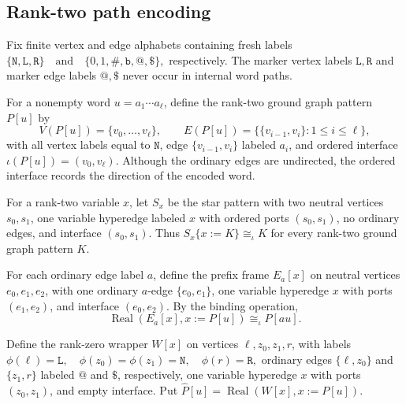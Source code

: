 \documentclass[11pt]{article}
\theoremstyle{definition}
\theoremstyle{remark}
\newcommand{\Real}{\operatorname{Real}}
\begin{document}
\subsection{Rank-two path encoding}

Fix finite vertex and edge alphabets containing fresh labels
\(\{\mathtt N,\mathtt L,\mathtt R\} \quad\text{and}\quad \{0,1,\#,\mathtt b,\mathtt{@},\mathtt{\$}\},\)
respectively.  The marker vertex labels \(\mathtt L,\mathtt R\) and marker
edge labels \(\mathtt{@},\mathtt{\$}\) never occur in internal word paths.

For a nonempty word \(u=a_1\cdots a_\ell\), define the rank-two ground graph
pattern \(P[u]\) by
\[
V(P[u])=\{v_0,\ldots,v_\ell\},
\qquad
E(P[u])=\{\{v_{i-1},v_i\}:1\le i\le\ell\},
\]
with all vertex labels equal to \(\mathtt N\), edge
\(\{v_{i-1},v_i\}\) labeled \(a_i\), and ordered interface
\(\iota(P[u])=(v_0,v_\ell).\)
Although the ordinary edges are undirected, the ordered interface records the
direction of the encoded word.

For a rank-two variable \(x\), let \(S_x\) be the star pattern with two
neutral vertices \(s_0,s_1\), one variable hyperedge labeled \(x\) with
ordered ports \((s_0,s_1)\), no ordinary edges, and interface
\((s_0,s_1)\). Thus
\(S_x\{x:=K\}\cong_\iota K\)
for every rank-two ground graph pattern \(K\).

For each ordinary edge label \(a\), define the prefix frame \(E_a[x]\) on
neutral vertices \(e_0,e_1,e_2\), with one ordinary \(a\)-edge
\(\{e_0,e_1\}\), one variable hyperedge \(x\) with ports \((e_1,e_2)\), and
interface \((e_0,e_2)\). By the binding operation,
\begin{equation}
\label{eq:prefix-frame-binding}
\boxed{
\Real(E_a[x],x:=P[u])\cong_\iota P[au].
}
\end{equation}

Define the rank-zero wrapper \(W[x]\) on vertices
\(\ell,z_0,z_1,r\), with labels
\(\phi(\ell)=\mathtt L, \quad \phi(z_0)=\phi(z_1)=\mathtt N, \quad \phi(r)=\mathtt R,\)
ordinary edges \(\{\ell,z_0\}\) and \(\{z_1,r\}\) labeled
\(\mathtt{@}\) and \(\mathtt{\$}\), respectively, one variable hyperedge
\(x\) with ports \((z_0,z_1)\), and empty interface. Put
\(\widehat P[u]=\Real(W[x],x:=P[u]).\)
\end{document}
